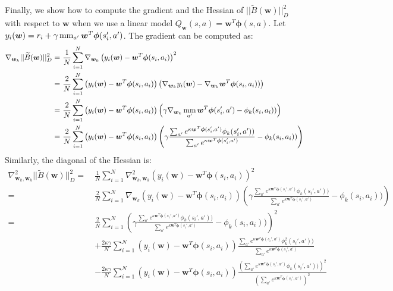 \documentclass{article}
\newcommand{\mm}{\operatornamewithlimits{mm}}
\begin{document}
Finally, we show how to compute the gradient and the Hessian of $||\widetilde{B}(\bm{w})||_D^2$ with respect to $\bm{w}$ when we use a linear model $Q_{\bm{w}}(s,a) = \bm{w}^T\bm{\phi}(s,a)$. Let $y_i(\bm{w}) = r_i + \gamma\mm_{a'}\bm{w}^T\bm{\phi}(s_i',a')$. The gradient can be computed as:
\begin{align}
\nabla_{\bm{w}_k} ||\widetilde{B}(\bm{w})||_D^2 =\ & 
\frac{1}{N}\sum_{i=1}^N \nabla_{\bm{w}_k} \left( y_i(\bm{w}) - \bm{w}^T\bm{\phi}(s_i,a_i) \right)^2 \\ =\ &
\frac{2}{N}\sum_{i=1}^N \left( y_i(\bm{w}) - \bm{w}^T\bm{\phi}(s_i,a_i) \right)\left( \nabla_{\bm{w}_k}y_i(\bm{w}) - \nabla_{\bm{w}_k}\bm{w}^T\bm{\phi}(s_i,a_i)) \right) \\ =\ &
\frac{2}{N}\sum_{i=1}^N \left( y_i(\bm{w}) - \bm{w}^T\bm{\phi}(s_i,a_i) \right)\left( \gamma\nabla_{\bm{w}_k}\mm_{a'}\bm{w}^T\bm{\phi}(s_i',a') - \phi_k(s_i,a_i)) \right) \\ =\ &
\frac{2}{N}\sum_{i=1}^N \left( y_i(\bm{w}) - \bm{w}^T\bm{\phi}(s_i,a_i) \right)\left( \gamma\frac{\sum_{a'} e^{\kappa \bm{w}^T\bm{\phi}(s_i',a')} \phi_k(s_i',a'))}{\sum_{a'} e^{\kappa \bm{w}^T\bm{\phi}(s_i',a')}} - \phi_k(s_i,a_i)) \right)
\end{align}
Similarly, the diagonal of the Hessian is:
\begin{align}
\nabla_{\bm{w}_k,\bm{w}_k}^2 ||\widetilde{B}(\bm{w})||_D^2 =\ & 
\frac{1}{N}\sum_{i=1}^N \nabla_{\bm{w}_k,\bm{w}_k}^2 \left( y_i(\bm{w}) - \bm{w}^T\bm{\phi}(s_i,a_i) \right)^2 \\ =\ &
\frac{2}{N}\sum_{i=1}^N \nabla_{\bm{w}_k} \left( y_i(\bm{w}) - \bm{w}^T\bm{\phi}(s_i,a_i) \right)\left( \gamma\frac{\sum_{a'} e^{\kappa \bm{w}^T\bm{\phi}(s_i',a')} \phi_k(s_i',a'))}{\sum_{a'} e^{\kappa \bm{w}^T\bm{\phi}(s_i',a')}} - \phi_k(s_i,a_i)) \right) \\ =\ &
\frac{2}{N}\sum_{i=1}^N \left( \gamma\frac{\sum_{a'} e^{\kappa \bm{w}^T\bm{\phi}(s_i',a')} \phi_k(s_i',a'))}{\sum_{a'} e^{\kappa \bm{w}^T\bm{\phi}(s_i',a')}} - \phi_k(s_i,a_i)) \right)^2 \\ \ \ & + \frac{2\kappa\gamma}{N}\sum_{i=1}^N \left( y_i(\bm{w}) - \bm{w}^T\bm{\phi}(s_i,a_i) \right) \frac{\sum_{a'} e^{\kappa \bm{w}^T\bm{\phi}(s_i',a')} \phi_k^2(s_i',a'))}{\sum_{a'} e^{\kappa \bm{w}^T\bm{\phi}(s_i',a')}} \\ \ \ & - \frac{2\kappa\gamma}{N}\sum_{i=1}^N \left( y_i(\bm{w}) - \bm{w}^T\bm{\phi}(s_i,a_i) \right) \frac{\left(\sum_{a'} e^{\kappa \bm{w}^T\bm{\phi}(s_i',a')} \phi_k(s_i',a'))\right)^2}{\left(\sum_{a'} e^{\kappa \bm{w}^T\bm{\phi}(s_i',a')}\right)^2}
\end{align}
\end{document}
